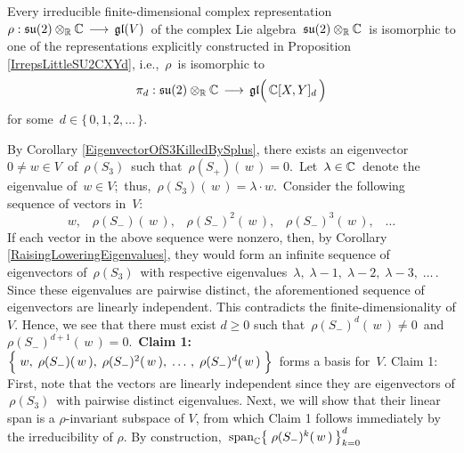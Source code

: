 \vskip 0.5cm
\begin{theorem}
\mbox{}
\vskip 0.1cm
\noindent
Every irreducible finite-dimensional complex representation
\,$\rho : \mathfrak{su}(2) \otimes_{\mathbb{R}} \mathbb{C} \,\longrightarrow\, \mathfrak{gl}\!\left(V\right)$\,
of the complex Lie algebra
\,$\mathfrak{su}(2) \otimes_{\mathbb{R}} \mathbb{C}$\,
is isomorphic to one of the representations explicitly constructed in Proposition \ref{IrrepsLittleSU2CXYd},
i.e., \,$\rho$\, is isomorphic to
\begin{equation*}
\pi_{d} : \su(2) \otimes_{\Re} \C \,\longrightarrow\, \gl\!\left(\,\overset{{\color{white}.}}{\C}[X,Y]_{d}\,\right)
\end{equation*}
for some \,$d \in \{\,0, 1, 2, \ldots \,\}$.
\end{theorem}
\proof
By Corollary \ref{EigenvectorOfS3KilledBySplus}, there exists an eigenvector
\,$0 \neq w \in V$\, of \,$\rho(S_{3})$\, such that \,$\rho(S_{+})(\,w\,) = 0$.\,
Let \,$\lambda \in \mathbb{C}$\, denote the eigenvalue of \,$w \in V$;\,
thus, \,$\rho(S_{3})(\,w\,) = \lambda \cdot w$.\,
Consider the following sequence of vectors in \,$V$:\,
\begin{equation*}
w,\;\;\; \rho(S_{-})(\,w\,),\;\;\; \rho(S_{-})^{2}(\,w\,),\;\;\; \rho(S_{-})^{3}(\,w\,),\;\;\; \ldots
\end{equation*}
If each vector in the above sequence were nonzero, then,
by Corollary \ref{RaisingLoweringEigenvalues}, they would form an infinite sequence of eigenvectors of
\,$\rho(S_{3})$\, with respective eigenvalues \,$\lambda,\;\lambda-1,\;\lambda-2,\;\lambda-3,\;\ldots$\,.
Since these eigenvalues are pairwise distinct, the aforementioned sequence of eigenvectors are linearly independent.
This contradicts the finite-dimensionality of $V$.
Hence, we see that there must exist $d \geq 0$ such that
\,$\rho(S_{-})^{d}(\,w\,) \neq 0$\, and \,$\rho(S_{-})^{d+1}(\,w\,) = 0$.\,
\vskip 0.5cm
\noindent
\textbf{Claim 1:}\quad
$\left\{\;\overset{{\color{white}-}}{w},\; \rho(S_{-})(\,w\,),\; \rho(S_{-})^{2}(\,w\,),\; \ldots\,,\; \rho(S_{-})^{d}(\,w\,) \;\right\}$\,
forms a basis for \,$V$.
\vskip 0.1cm
\noindent
\proofof Claim 1:\quad
First, note that the vectors are linearly independent since they are eigenvectors of
\,$\rho(S_{3})$\,
with pairwise distinct eigenvalues.
Next, we will show that their linear span is a $\rho$-invariant subspace of $V$,
from which Claim 1 follows immediately by the irreducibility of $\rho$.
By construction,
\,$\textnormal{span}_{\mathbb{C}}\!\left\{\;\rho(S_{-})^{k}(\,w\,)\,\right\}_{k=0}^{d}$\,
